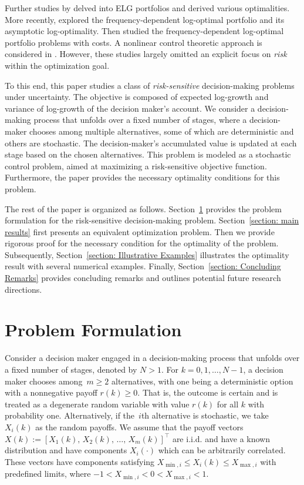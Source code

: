 Further studies by \cite{algoet1988asymptotic, cover2006elements} delved into ELG portfolios and derived various optimalities. More recently, \cite{hsieh2020necessary, hsieh2023asymptotic} explored the frequency-dependent log-optimal portfolio and its asymptotic log-optimality. Then
\cite{wong2023frequency} studied the frequency-dependent log-optimal portfolio problems with costs. A nonlinear control theoretic approach is considered in \cite{proskurnikov2023benefit}.
However, these studies largely omitted an explicit focus on \textit{risk} within the optimization goal.


To this end, this paper studies a class of \textit{risk-sensitive} decision-making problems under uncertainty. The objective is composed of expected log-growth and variance of log-growth of the decision maker's account.
We consider a decision-making process that unfolds over a fixed number of stages, where a decision-maker chooses among multiple alternatives, some of which are deterministic and others are stochastic. The decision-maker's accumulated value is updated at each stage based on the chosen alternatives. This problem is modeled as a stochastic control problem, aimed at maximizing a risk-sensitive objective function. 
Furthermore, the paper provides the necessary optimality conditions for this problem.




 The rest of the paper is organized as follows. Section~\ref{section: problem formulation} provides the problem formulation for the risk-sensitive decision-making problem. Section~\ref{section: main results} first presents an equivalent optimization problem.
Then we provide rigorous proof for the necessary condition for the optimality of the problem. Subsequently, Section~\ref{section: Illustrative Examples} illustrates the optimality result with several numerical examples. Finally, Section~\ref{section: Concluding Remarks} provides concluding remarks and outlines potential future research directions.


 
	
 
\section{Problem Formulation}\label{section: problem formulation}	
Consider a decision maker engaged in a decision-making process that unfolds over a fixed number of stages, denoted by $N>1$. 
For $k=0,1,\dots, N-1$, a decision maker chooses among~$m \geq 2$ alternatives, with one being a deterministic option with a nonnegative payoff $r(k) \geq 0.$ That is, the outcome is certain and is treated as a degenerate random variable with value $r(k)$ for all $k$ with probability one. 
Alternatively, if the~$i$th alternative is stochastic, we take~$X_i(k)$ as the random payoffs.
We assume that the payoff vectors~$
X(k):=\left[ X_1(k), \, X_2(k),\,  \dots, \,X_m(k) \right]^\top 
$
are i.i.d. and have a known distribution and have components $X_i(\cdot)$ which can be arbitrarily correlated. 
These vectors have components satisfying
$
X_{\min,i}  \leq X_i(k) \leq X_{\max,i}
$
with predefined limits, where $-1 < X_{\min,i} < 0 < X_{\max,i} < 1$.


